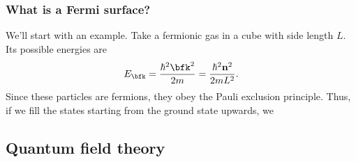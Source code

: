 \documentclass[11pt]{article}
\begin{document}
\subsubsection{What is a Fermi surface?}

We'll start with an example. Take a fermionic gas in a cube with side length $L$.
Its possible energies are
\begin{align*}
    E_\bfk = \frac{\hbar^2 \bfk^2}{2m} = \frac{\hbar^2 \mathbf{n}^2}{2mL^2}. 
\end{align*}
Since these particles are fermions, they obey the Pauli exclusion principle.
Thus, if we fill the states starting from the ground state upwards, we

\subsection{Quantum field theory}
\end{document}
